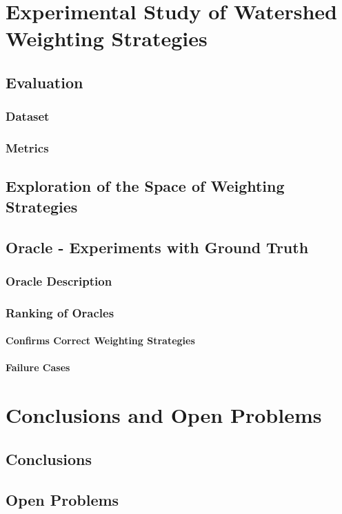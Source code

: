 \chapter{Experimental Study of Watershed Weighting Strategies}
\label{Chapter5}
\section{Evaluation}
\subsection{Dataset}
\subsection{Metrics}
\section{Exploration of the Space of Weighting Strategies}
\section{Oracle - Experiments with Ground Truth}
\subsection{Oracle Description}
\subsection{Ranking of Oracles}
\subsubsection{Confirms Correct Weighting Strategies}
\subsubsection{Failure Cases}

\chapter{Conclusions and Open Problems}
\label{Chapter6}
\section{Conclusions}
\section{Open Problems}
